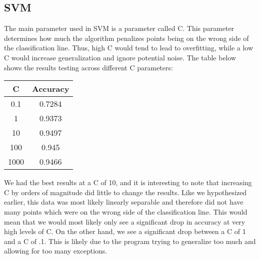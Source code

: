 \documentclass[fleqn,11pt]{article}
\begin{document}
\begin{multicols}{2}
        \subsection{SVM}
        The main parameter used in SVM is a parameter called C. This parameter determines how much 
        the algorithm penalizes points being on the wrong side of the classification line. Thus, 
        high C would tend to lead to overfitting, while a low C would increase generalization and 
        ignore potential noise. The table below shows the results testing across different C 
        parameters:
        \begin{center}
            \begin{tabular}{|c|c|}
                \hline
                C       & Accuracy\\
                \hline
                0.1     & 0.7284\\
                1       & 0.9373\\
                10      & 0.9497\\
                100     & 0.945\\
                1000    & 0.9466\\
                \hline
            \end{tabular}
        \end{center}
        We had the best results at a C of 10, and it is interesting to note that increasing C by 
        orders of magnitude did little to change the results. Like we hypothesized earlier, this 
        data was most likely linearly separable and therefore did not have many points which were 
        on the wrong side of the classification line. This would mean that we would most likely 
        only see a significant drop in accuracy at very high levels of C. On the other hand, we 
        see a significant drop between a C of 1 and a C of .1. This is likely due to the program 
        trying to generalize too much and allowing for too many exceptions.\\
\end{multicols}
\end{document}
